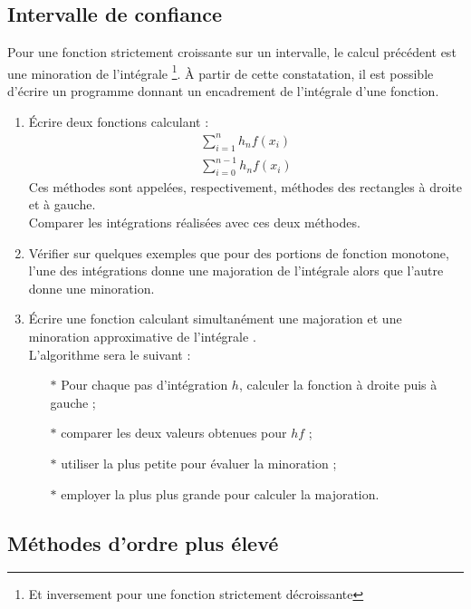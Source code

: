 \subsection{Intervalle de confiance}
Pour une fonction strictement croissante  sur un intervalle, le calcul
précédent  est une  minoration  de l'intégrale \footnote{Et inversement pour  une
fonction strictement décroissante}. À  partir de cette constatation, il
est  possible   d'écrire  un  programme  donnant   un  encadrement  de
l'intégrale d'une fonction.
\begin{enumerate}
\item Écrire deux fonctions calculant :
  \begin{eqnarray*}
    \sum_{i=1}^n h_n f(x_i)\\ \sum_{i=0}^{n-1}h_n f(x_i)
  \end{eqnarray*}
  Ces méthodes sont appelées,  respectivement, méthodes des rectangles
  à droite et  à gauche.  \\ Comparer les  intégrations réalisées avec
  ces deux méthodes.
  
\item  Vérifier  sur  quelques  exemples  que  pour  des  portions  de
  fonction monotone, l'une des  intégrations donne une majoration de
  l'intégrale alors que l'autre donne une minoration.  %
\item Écrire  une fonction  calculant simultanément une  majoration et
  une       minoration        approximative       de       l'intégrale
  .\\ L'algorithme sera le suivant :
  \begin{itemize}
  \item[$\ast$]  Pour  chaque  pas   d'intégration  $h$,  calculer  la
    fonction à droite puis à gauche ;
  \item[$\ast$] comparer les deux valeurs obtenues pour $hf$ ;
  \item[$\ast$] utiliser la plus petite pour évaluer la minoration ;
  \item[$\ast$] employer la plus plus grande pour calculer la majoration.
\end{itemize}
\end{enumerate}

\subsection{Méthodes d'ordre plus élevé {\sc[Facultatif]}}


